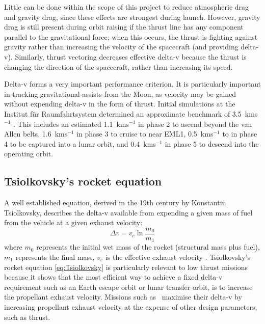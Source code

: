 Little can be done within the scope of this project to reduce atmospheric drag and gravity drag, since these effects are strongest during launch. However, gravity drag is still present during orbit raising if the thrust line has any component parallel to the gravitational force; when this occurs, the thrust is fighting against gravity rather than increasing the velocity of the spacecraft (and providing delta-v). Similarly, thrust vectoring decreases effective delta-v because the thrust is changing the direction of the spacecraft, rather than increasing its speed. 
 
Delta-v forms a very important performance criterion. It is particularly important in tracking gravitational assists from the Moon, as velocity may be gained without expending delta-v in the form of thrust. Initial simulations at the Institut f\"{u}r Raumfahrtsystem determined an approximate benchmark of 3.5~kms$^{-1}$ \parencite{Roeser2006}. This includes an estimated 1.1~kms$^{-1}$ in phase 2 to ascend beyond the van Allen belts, 1.6~kms$^{-1}$ in phase 3 to cruise to near EML1, 0.5~kms$^{-1}$ to in phase 4 to be captured into a lunar orbit, and 0.4~kms$^{-1}$ in phase 5 to descend into the operating orbit.

\subsection{Tsiolkovsky's rocket equation} \label{sec:Tsiolkovsky}

A well established equation, derived in the 19th century by Konstantin Tsiolkovsky, describes the delta-v available from expending a given mass of fuel from the vehicle at a given exhaust velocity:
\begin{equation}
\Delta v=v_{e}\ln\frac{m_{0}}{m_{1}}\label{eq:Tsiolkovsky}
\end{equation}
where $m_{0}$ represents the initial wet mass of the rocket (structural mass plus fuel), $m_{1}$ represents the final mass, $v_{e}$ is the effective exhaust velocity \parencite{Tsiolkovsky1903,Chobotov2002}. Tsiolkovsky's rocket equation \eqref{eq:Tsiolkovsky} is particularly relevant to low thrust missions because it shows that the most efficient way to achieve a fixed delta-v requirement such as an Earth escape orbit or lunar transfer orbit, is to increase the propellant exhaust velocity. Missions such as \BW\ maximise their delta-v by increasing propellant exhaust velocity at the expense of other design parameters, such as thrust.

